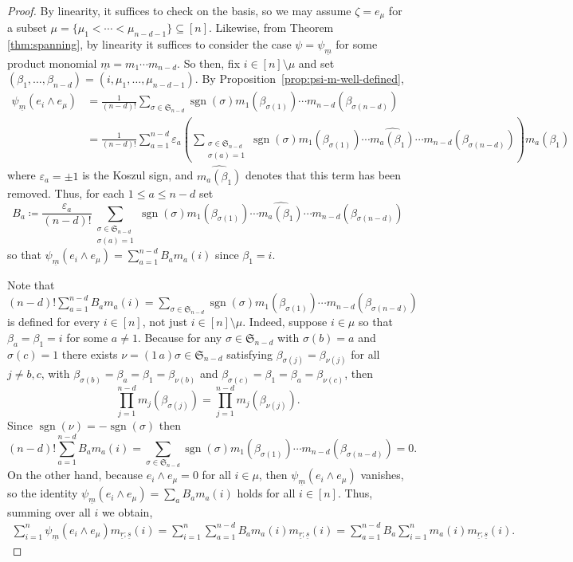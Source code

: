 \documentclass[11pt, reqno]{amsart}
\theoremstyle{definition}
\theoremstyle{remark}
\numberwithin{equation}{section}
\newcommand{\0}{\emptyset}
\renewcommand{\S}{\mathfrak{S}}
\newcommand{\m}{\underline{m}}
\renewcommand{\r}{\underline{r}}
\newcommand{\s}{\underline{s}}
\DeclareMathOperator{\sgn}{sgn}
\begin{document}
\begin{proof}
    By linearity, it suffices to check on the basis, so we may assume $\zeta = e_\mu$ for a subset $\mu = \{\mu_1 < \cdots < \mu_{n-d-1}\} \subseteq [n]$. 
    Likewise, from Theorem \ref{thm:spanning}, by linearity it suffices to consider the case $\psi = \psi_{\m}$ for some product monomial $\m=m_1\cdots m_{n-d}$. So then, fix $i \in [n] \setminus \mu$ and set $(\beta_1,\ldots, \beta_{n-d}) = (i,\mu_1,\ldots,\mu_{n-d-1})$. By Proposition~\ref{prop:psi-m-well-defined},
    \begin{align*}
        \psi_{\m}(e_i \wedge e_\mu) 
        &= \frac{1}{(n-d)!} \sum_{\sigma \in \S_{n-d}} \sgn(\sigma) m_1(\beta_{\sigma(1)}) \cdots m_{n-d}(\beta_{\sigma({n-d})}) \\
        &= \frac{1}{(n-d)!}\sum_{a=1}^{n-d} \varepsilon_a \left(\sum_{\substack{\sigma \in \S_{n-d}\\ \sigma(a)=1}} \sgn(\sigma) m_1(\beta_{\sigma(1)}) \cdots \widehat{m_a(\beta_1)}\cdots m_{n-d}(\beta_{\sigma({n-d})})\right) m_a(\beta_1)
    \end{align*}
    where $\varepsilon_a = \pm 1$ is the Koszul sign, and $\widehat{m_a(\beta_1)}$ denotes that this term has been removed. Thus, for each $1\leq a \leq n-d$ set
    \[
    B_a\coloneqq \frac{\varepsilon_a}{(n-d)!} \sum_{\substack{\sigma \in \S_{n-d}\\ \sigma(a)=1}} \sgn(\sigma) m_1(\beta_{\sigma(1)}) \cdots \widehat{m_a(\beta_1)}\cdots m_{n-d}(\beta_{\sigma({n-d})})
    \]
    so that $\psi_{\m}(e_i \wedge e_\mu) = \sum_{a=1}^{n-d} B_a m_a(i)$ since $\beta_1=i$. 

    Note that $(n-d)!\sum_{a=1}^{n-d} B_a m_a(i) = 
    \sum_{\sigma \in \S_{n-d}} \sgn(\sigma) m_1(\beta_{\sigma(1)}) \cdots 
    m_{n-d}(\beta_{\sigma({n-d})})$ is defined for every $i \in [n]$, 
    not just $i \in [n]\setminus \mu$. 
    Indeed, suppose $i \in \mu$ so that $\beta_a = \beta_1=i$ for some $a \neq 1$.
    Because for any $\sigma \in \S_{n-d}$ with $\sigma(b) = a$ and $\sigma(c)=1$ there exists 
    $\nu=(1\,a) \sigma \in \S_{n-d}$ satisfying 
    $\beta_{\sigma(j)} = \beta_{\nu(j)}$ for all $j \neq b,c$, with 
    $\beta_{\sigma(b)}=\beta_{a}=\beta_1=\beta_{\nu(b)}$ and 
    $\beta_{\sigma(c)} = \beta_1=\beta_a = \beta_{\nu(c)}$, then 
    \[
        \prod_{j=1}^{n-d} m_j(\beta_{\sigma(j)}) = \prod_{j=1}^{n-d} m_j(\beta_{\nu(j)}). 
    \]
    Since $\sgn(\nu)=-\sgn(\sigma)$ then 
    \[
        (n-d)! \sum_{a=1}^{n-d} B_a m_a(i) = 
        \sum_{\sigma \in \S_{n-d}} 
        \sgn(\sigma) m_1(\beta_{\sigma(1)}) \cdots m_{n-d}(\beta_{\sigma({n-d})})=0.
    \]
    On the other hand, because $e_i \wedge e_\mu = 0$ for all $i \in \mu$, 
    then $\psi_{\m}(e_i \wedge e_\mu)$ vanishes, so the identity 
    $\psi_{\m}(e_i \wedge e_\mu) = \sum_{a} B_a m_a(i)$ holds for all $i \in [n]$.
    Thus, summing over all $i$ we obtain, 
    \begin{align} \label{eq:Ba-sum}
        \sum_{i=1}^n \psi_{\m}(e_i \wedge e_\mu) m_{\r;\s}(i) 
        =  \sum_{i=1}^n \sum_{a=1}^{n-d} B_a m_a(i) m_{\r;\s}(i)
        = \sum_{a=1}^{n-d} B_a \sum_{i=1}^n  m_a(i) m_{\r;\s}(i).
    \end{align}
    

\end{proof}
\end{document}
